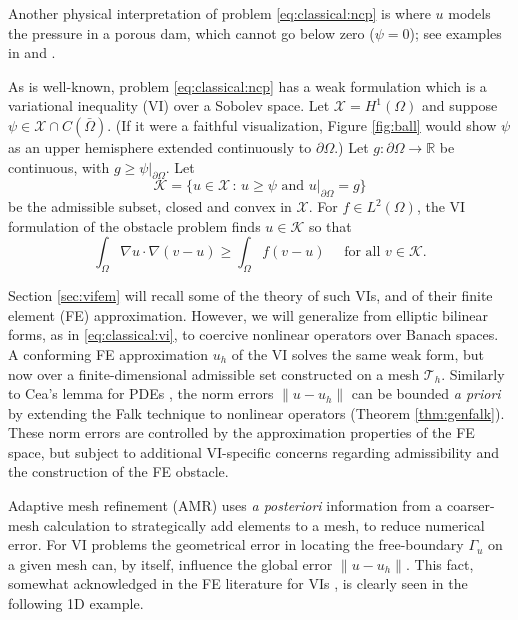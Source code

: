 \documentclass[]{interact}
\theoremstyle{plain}%
\theoremstyle{definition}
\theoremstyle{remark}
\newcommand{\RR}{\mathbb{R}}
\newcommand{\cK}{\mathcal{K}}
\newcommand{\cT}{\mathcal{T}}
\newcommand{\cX}{\mathcal{X}}
\begin{document}
Another physical interpretation of problem \eqref{eq:classical:ncp} is where $u$ models the pressure in a porous dam, which cannot go below zero ($\psi=0$); see examples in \cite{AinsworthOdenLee1993} and \cite{Bueler2021}.

As is well-known, problem \eqref{eq:classical:ncp} has a weak formulation which is a variational inequality (VI) over a Sobolev space.  Let $\cX=H^1(\Omega)$ \cite{ElmanSilvesterWathen2014} and suppose $\psi \in \cX \cap C(\bar\Omega)$.  (If it were a faithful visualization, Figure \ref{fig:ball} would show $\psi$ as an upper hemisphere extended continuously to $\partial\Omega$.)  Let $g:\partial \Omega\to \RR$ be continuous, with $g\ge\psi|_{\partial \Omega}$.  Let
\begin{equation} \label{eq:classical:admissible}
\cK = \{u \in \cX \,:\, u \ge \psi \text{ and } u|_{\partial \Omega} = g\}
\end{equation}
be the admissible subset, closed and convex in $\cX$.  For $f\in L^2(\Omega)$, the VI formulation of the obstacle problem \cite{KinderlehrerStampacchia1980} finds $u\in \cK$ so that
\begin{equation} \label{eq:classical:vi}
\int_\Omega \nabla u \cdot \nabla(v - u) \ge \int_\Omega f(v - u) \quad \text{ for all } v \in \cK.
\end{equation}

Section \ref{sec:vifem} will recall some of the theory of such VIs, and of their finite element (FE) approximation.  However, we will generalize from elliptic bilinear forms, as in \eqref{eq:classical:vi}, to coercive nonlinear operators over Banach spaces.  A conforming FE approximation $u_h$ of the VI solves the same weak form, but now over a finite-dimensional admissible set constructed on a mesh $\cT_h$.  Similarly to Cea's lemma for PDEs \cite{ElmanSilvesterWathen2014}, the norm errors $\|u-u_h\|$ can be bounded \emph{a priori} by extending the Falk \cite{Falk1974} technique to nonlinear operators (Theorem \ref{thm:genfalk}).  These norm errors are controlled by the approximation properties of the FE space, but subject to additional VI-specific concerns regarding admissibility and the construction of the FE obstacle.

Adaptive mesh refinement (AMR) uses \emph{a posteriori} information from a coarser-mesh calculation to strategically add elements to a mesh, to reduce numerical error.  For VI problems the geometrical error in locating the free-boundary $\Gamma_u$ on a given mesh can, by itself, influence the global error $\|u-u_h\|$.  This fact, somewhat acknowledged in the FE literature for VIs \cite{Suttmeier2008}, is clearly seen in the following 1D example.
\end{document}
